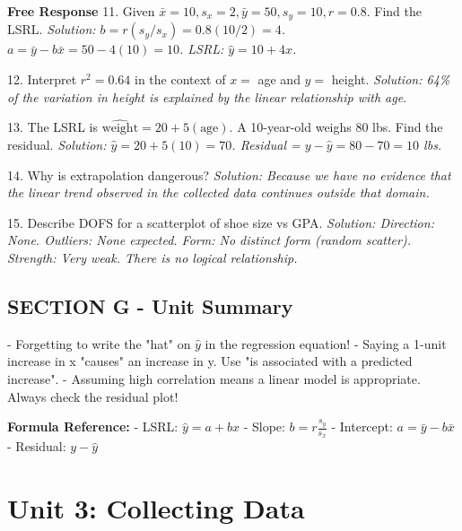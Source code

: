 \begin{workbookbox}
\textbf{Free Response}
11. Given $\bar{x}=10, s_x=2, \bar{y}=50, s_y=10, r=0.8$. Find the LSRL.
\textit{Solution: $b = r(s_y/s_x) = 0.8(10/2) = 4$. $a = \bar{y} - b\bar{x} = 50 - 4(10) = 10$. LSRL: $\hat{y} = 10 + 4x$.}

12. Interpret $r^2 = 0.64$ in the context of $x=$ age and $y=$ height.
\textit{Solution: 64\% of the variation in height is explained by the linear relationship with age.}

13. The LSRL is $\hat{\text{weight}} = 20 + 5(\text{age})$. A 10-year-old weighs 80 lbs. Find the residual.
\textit{Solution: $\hat{y} = 20 + 5(10) = 70$. Residual = $y - \hat{y} = 80 - 70 = 10$ lbs.}

14. Why is extrapolation dangerous?
\textit{Solution: Because we have no evidence that the linear trend observed in the collected data continues outside that domain.}

15. Describe DOFS for a scatterplot of shoe size vs GPA.
\textit{Solution: Direction: None. Outliers: None expected. Form: No distinct form (random scatter). Strength: Very weak. There is no logical relationship.}
\end{workbookbox}

\section{SECTION G - Unit Summary}
\begin{trapbox}
- Forgetting to write the "hat" on $\hat{y}$ in the regression equation!
- Saying a 1-unit increase in x "causes" an increase in y. Use "is associated with a predicted increase".
- Assuming high correlation means a linear model is appropriate. Always check the residual plot!
\end{trapbox}

\textbf{Formula Reference:}
- LSRL: $\hat{y} = a + bx$
- Slope: $b = r \frac{s_y}{s_x}$
- Intercept: $a = \bar{y} - b\bar{x}$
- Residual: $y - \hat{y}$
\chapter{Unit 3: Collecting Data}

